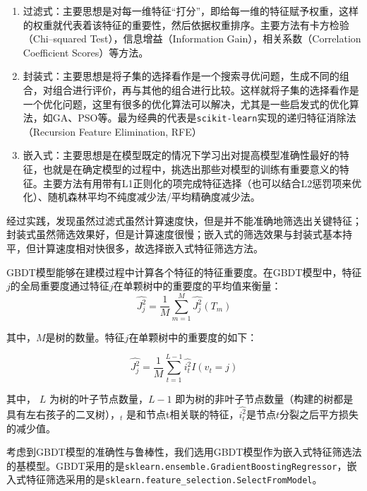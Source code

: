 \documentclass[bwprint]{gmcmthesis}
\begin{document}
\begin{enumerate}
	\item 过滤式：主要思想是对每一维特征“打分”，即给每一维的特征赋予权重，这样的权重就代表着该特征的重要性，然后依据权重排序。主要方法有卡方检验（Chi--squared Test），信息增益（Information Gain），相关系数（Correlation Coefficient Scores）等方法。
	\item 封装式：主要思想是将子集的选择看作是一个搜索寻优问题，生成不同的组合，对组合进行评价，再与其他的组合进行比较。这样就将子集的选择看作是一个优化问题，这里有很多的优化算法可以解决，尤其是一些启发式的优化算法，如GA、PSO等。最为经典的代表是\texttt{scikit-learn}实现的递归特征消除法（Recursion Feature Elimination, RFE）
	\item 嵌入式：主要思想是在模型既定的情况下学习出对提高模型准确性最好的特征，也就是在确定模型的过程中，挑选出那些对模型的训练有重要意义的特征。主要方法有用带有L1正则化的项完成特征选择（也可以结合L2惩罚项来优化）、随机森林平均不纯度减少法/平均精确度减少法。
\end{enumerate}

经过实践，发现虽然过滤式虽然计算速度快，但是并不能准确地筛选出关键特征；封装式虽然筛选效果好，但是计算速度很慢；嵌入式的筛选效果与封装式基本持平，但计算速度相对快很多，故选择嵌入式特征筛选方法。


GBDT模型能够在建模过程中计算各个特征的特征重要度。在GBDT模型中，特征$j$的全局重要度通过特征$j$在单颗树中的重要度的平均值来衡量： 
\begin{equation}\label{eq:gbdt-1}
	\hat{J^2_j} = \frac{1}{M} \sum^M_{m=1}\hat{J^2_j}(T_m)
\end{equation}

其中，$M$是树的数量。特征$j$在单颗树中的重要度的如下：

\begin{equation}\label{eq:gbdt-2}
	\hat{J^2_j} = \frac{1}{M} \sum^{L-1}_{t=1}\hat{i^2_t} I (v_t=j)
\end{equation}

其中， $L$ 为树的叶子节点数量，$L−1$ 即为树的非叶子节点数量（构建的树都是具有左右孩子的二叉树），$_t$ 是和节点t相关联的特征，$\hat{i^2_t}$是节点$t$分裂之后平方损失的减少值。

考虑到GBDT模型的准确性与鲁棒性，我们选用GBDT模型作为嵌入式特征筛选法的基模型。GBDT采用的是\texttt{sklearn.ensemble.GradientBoostingRegressor}，嵌入式特征筛选采用的是\texttt{sklearn.feature\_selection.SelectFromModel}。
\end{document}
